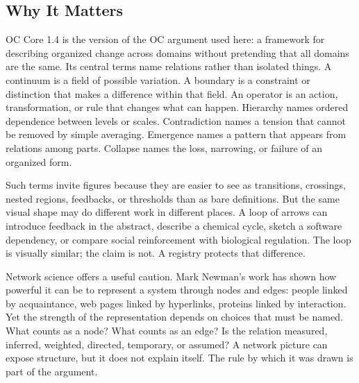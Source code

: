 \documentclass[11pt,a4paper,openany]{book}
\begin{document}
\subsection{Why It Matters}
OC Core 1.4 is the version of the OC argument used here: a framework for describing organized change across domains without pretending that all domains are the same. Its central terms name relations rather than isolated things. A continuum is a field of possible variation. A boundary is a constraint or distinction that makes a difference within that field. An operator is an action, transformation, or rule that changes what can happen. Hierarchy names ordered dependence between levels or scales. Contradiction names a tension that cannot be removed by simple averaging. Emergence names a pattern that appears from relations among parts. Collapse names the loss, narrowing, or failure of an organized form. \cite{kauffman_autocatalytic,raf_networks}\par
Such terms invite figures because they are easier to see as transitions, crossings, nested regions, feedbacks, or thresholds than as bare definitions. But the same visual shape may do different work in different places. A loop of arrows can introduce feedback in the abstract, describe a chemical cycle, sketch a software dependency, or compare social reinforcement with biological regulation. The loop is visually similar; the claim is not. A registry protects that difference.\par
Network science offers a useful caution. Mark Newman's work has shown how powerful it can be to represent a system through nodes and edges: people linked by acquaintance, web pages linked by hyperlinks, proteins linked by interaction. Yet the strength of the representation depends on choices that must be named. What counts as a node? What counts as an edge? Is the relation measured, inferred, weighted, directed, temporary, or assumed? A network picture can expose structure, but it does not explain itself. The rule by which it was drawn is part of the argument.\par
\end{document}
